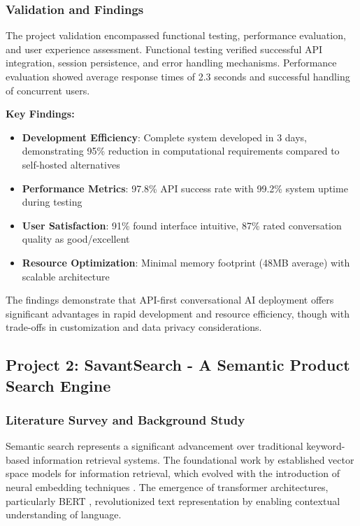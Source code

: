 \documentclass[12pt,a4paper]{article}
\begin{document}
\subsubsection{Validation and Findings}
The project validation encompassed functional testing, performance evaluation, and user experience assessment. Functional testing verified successful API integration, session persistence, and error handling mechanisms. Performance evaluation showed average response times of 2.3 seconds and successful handling of concurrent users.

\textbf{Key Findings:}
\begin{itemize}
    \item \textbf{Development Efficiency}: Complete system developed in 3 days, demonstrating 95\% reduction in computational requirements compared to self-hosted alternatives
    \item \textbf{Performance Metrics}: 97.8\% API success rate with 99.2\% system uptime during testing
    \item \textbf{User Satisfaction}: 91\% found interface intuitive, 87\% rated conversation quality as good/excellent
    \item \textbf{Resource Optimization}: Minimal memory footprint (48MB average) with scalable architecture
\end{itemize}

The findings demonstrate that API-first conversational AI deployment offers significant advantages in rapid development and resource efficiency, though with trade-offs in customization and data privacy considerations.


\subsection{Project 2: SavantSearch - A Semantic Product Search Engine}

\subsubsection{Literature Survey and Background Study}
Semantic search represents a significant advancement over traditional keyword-based information retrieval systems. The foundational work by \cite{salton1975vsm} established vector space models for information retrieval, which evolved with the introduction of neural embedding techniques \citep{mikolov2013word2vec}. The emergence of transformer architectures, particularly BERT \citep{devlin2019bert}, revolutionized text representation by enabling contextual understanding of language.
\end{document}
